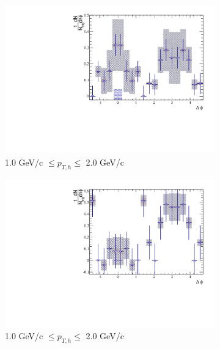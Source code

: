\begin{figure}[htbp]
\begin{subfigure}{0.5\textwidth}
		\includegraphics[width=\textwidth]{Plots/Correlations/subtracted/NPE_eh_corr_subtracted_primpt_4_5_cent_4_5_assopt_2_2.pdf}
		\caption{1.0 GeV/c $\leq p_{T,h} \leq$ 2.0 GeV/c}
		\label{fig:Sub2040c}
	\end{subfigure}	
	\begin{subfigure}{0.5\textwidth}
		\includegraphics[width=\textwidth]{Plots/Correlations/subtracted/NPE_eh_corr_subtracted_primpt_6_8_cent_4_5_assopt_2_2.pdf}
		\caption{1.0 GeV/c $\leq p_{T,h} \leq$ 2.0 GeV/c}
		\label{fig:Sub2040d}
	\end{subfigure}	
	\begin{subfigure}{0.5\textwidth}

\end{subfigure}
\end{figure}
